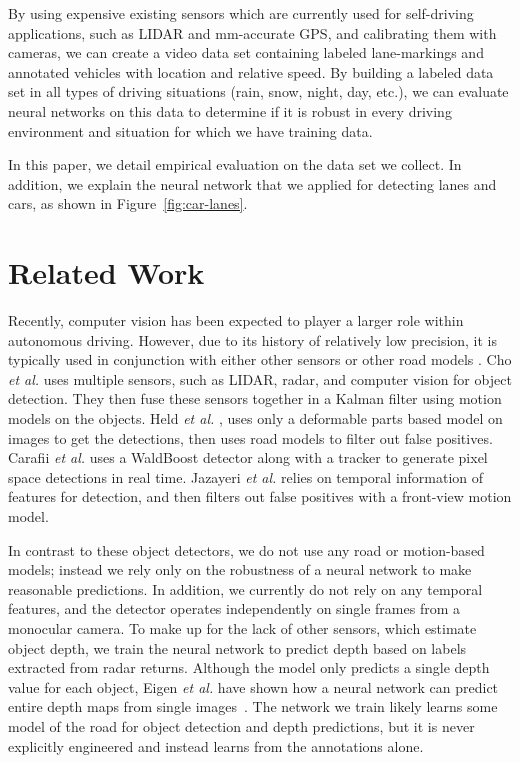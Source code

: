 \documentclass[journal]{IEEEtran}
\begin{document}
By using expensive existing sensors which are currently used for self-driving applications, such as LIDAR and mm-accurate GPS, and calibrating them with cameras, we can create a video data set containing labeled lane-markings and annotated vehicles with location and relative speed. By building a labeled data set in all types of driving situations (rain, snow, night, day, etc.), we can evaluate neural networks on this data to determine if it is robust in every driving environment and situation for which we have training data. 

In this paper, we detail empirical evaluation on the data set we collect. In addition, we explain the neural network that we applied for detecting lanes and cars, as shown in Figure~\ref{fig:car-lanes}.

\section{Related Work}
Recently, computer vision has been expected to player a larger role within autonomous driving. However, due to its history of relatively low precision, it is typically used in conjunction with either other sensors or other road models \cite{cho-2014,held-2012,carafii-2012,jazayeri-2011}. Cho \textit{et al.} \cite{cho-2014} uses multiple sensors, such as LIDAR, radar, and computer vision for object detection. They then fuse these sensors together in a Kalman filter using motion models on the objects. Held \textit{et al.} \cite{held-2012}, uses only a deformable parts based model on images to get the detections, then uses road models to filter out false positives. Carafii \textit{et al.} \cite{carafii-2012} uses a WaldBoost detector along with a tracker to generate pixel space detections in real time. Jazayeri \textit{et al.} \cite{jazayeri-2011} relies on temporal information of features for detection, and then filters out false positives with a front-view motion model.

In contrast to these object detectors, we do not use any road or motion-based models; instead we rely only on the robustness of a neural network to make reasonable predictions. In addition, we currently do not rely on any temporal features, and the detector operates independently on single frames from a monocular camera. To make up for the lack of other sensors, which estimate object depth, we train the neural network to predict depth based on labels extracted from radar returns. Although the model only predicts a single depth value for each object, Eigen \textit{et al.} have shown how a neural network can predict entire depth maps from single images~\cite{eigen-2014}. The network we train likely learns some model of the road for object detection and depth predictions, but it is never explicitly engineered and instead learns from the annotations alone. 
\end{document}
